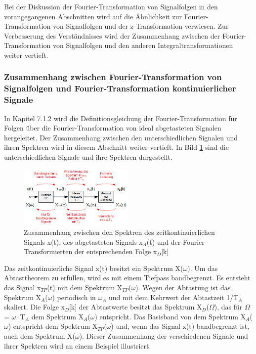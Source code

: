 \noindent Bei der Diskussion der Fourier-Transformation von Signalfolgen in den vorangegangenen Abschnitten wird auf die \"{A}hnlichkeit zur Fourier-Transformation von Signalfolgen und der z-Transformation verwiesen. Zur Verbesserung des Verst\"{a}ndnisses wird der Zusammenhang zwischen der Fourier-Transformation von Signalfolgen und den anderen Integraltransformationen weiter vertieft.

\subsubsection{Zusammenhang zwischen Fourier-Transformation von Signalfolgen und Fourier-Transformation kontinuierlicher Signale}

\noindent In Kapitel 7.1.2 wird die Definitionsgleichung der Fourier-Transformation f\"{u}r Folgen \"{u}ber die Fourier-Transformation von ideal abgetasteten Signalen hergeleitet. Der Zusammenhang zwischen den unterschiedlichen Signalen und ihren Spektren wird in diesem Abschnitt weiter vertieft. In Bild \ref{fig:SignalflussFT} sind die unterschiedlichen Signale und ihre Spektren dargestellt.

\begin{figure}[H]
  \centerline{\includegraphics[width=0.5\textwidth]{Kapitel7/Bilder/image14.png}}
  \caption{Zusammenhang zwischen den Spektren des zeitkontinuierlichen Signals x(t), des abgetasteten Signals x${}_{A}$(t) und der Fourier-Transformierten der entsprechenden Folge x${}_{D}$[k]}
  \label{fig:SignalflussFT}
\end{figure}

\noindent Das zeitkontinuierliche Signal x(t) besitzt ein Spektrum X($\omega$). Um das Abtasttheorem zu erf\"{u}llen, wird es mit einem Tiefpass bandbegrenzt. Es entsteht das Signal x${}_{TP}$(t) mit dem Spektrum X${}_{TP}$($\omega$). Wegen der Abtastung ist das Spektrum X${}_{A}$($\omega$) periodisch in $\omega_{A}$ und mit dem Kehrwert der Abtastzeit 1/T${}_{A}$ skaliert. Die Folge x${}_{D}$[k] der Abtastwerte besitzt das Spektrum X${}_{D}$($\Omega$), das f\"{u}r $\Omega$ = $\omega\cdot$T${}_{A}$ dem Spektrum X${}_{A}$($\omega$) entspricht. Das Basisband von dem Spektrum X${}_{A}$($\omega$) entspricht dem Spektrum X${}_{TP}$($\omega$) und, wenn das Signal x(t) bandbegrenzt ist, auch dem Spektrum X($\omega$). Dieser Zusammenhang der verschiedenen Signale und ihrer Spektren wird an einem Beispiel illustriert.\bigskip

